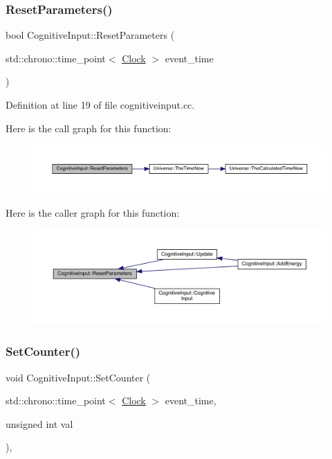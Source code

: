 \subsubsection{\texorpdfstring{Reset\+Parameters()}{ResetParameters()}}
{\footnotesize\ttfamily bool Cognitive\+Input\+::\+Reset\+Parameters (\begin{DoxyParamCaption}\item[{std\+::chrono\+::time\+\_\+point$<$ \hyperlink{universe_8h_a0ef8d951d1ca5ab3cfaf7ab4c7a6fd80}{Clock} $>$}]{event\+\_\+time }\end{DoxyParamCaption})}



Definition at line 19 of file cognitiveinput.\+cc.

Here is the call graph for this function\+:
\nopagebreak
\begin{figure}[H]
\begin{center}
\leavevmode
\includegraphics[width=350pt]{class_cognitive_input_a943605b820cc279533e19d24e11405c6_cgraph}
\end{center}
\end{figure}
Here is the caller graph for this function\+:
\nopagebreak
\begin{figure}[H]
\begin{center}
\leavevmode
\includegraphics[width=350pt]{class_cognitive_input_a943605b820cc279533e19d24e11405c6_icgraph}
\end{center}
\end{figure}
\mbox{\label{class_cognitive_input_a4f09c1f176b5406d95a14d7cb1ab75e6}} 
\subsubsection{\texorpdfstring{Set\+Counter()}{SetCounter()}}
{\footnotesize\ttfamily void Cognitive\+Input\+::\+Set\+Counter (\begin{DoxyParamCaption}\item[{std\+::chrono\+::time\+\_\+point$<$ \hyperlink{universe_8h_a0ef8d951d1ca5ab3cfaf7ab4c7a6fd80}{Clock} $>$}]{event\+\_\+time,  }\item[{unsigned int}]{val }\end{DoxyParamCaption})\hspace{0.3cm}{\ttfamily [inline]}, {\ttfamily [virtual]}}



